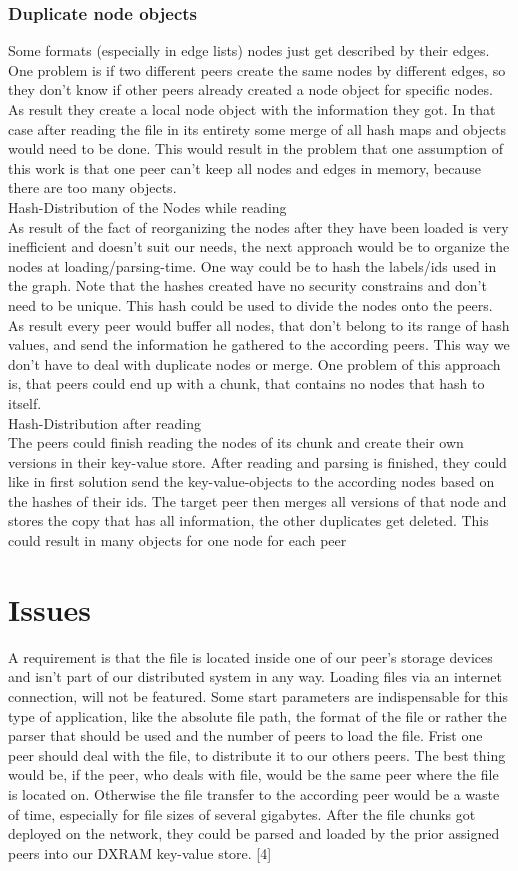 \subsubsection{Duplicate node objects}
Some formats (especially in edge lists) nodes just get described by their edges. One problem is if two different peers create the same nodes by different edges, so they don’t know if other peers already created a node object for specific nodes. As result they create a local node object with the information they got. In that case after reading the file in its entirety some merge of all hash maps and objects would need to be done. This would result in the problem that one assumption of this work is that one peer can’t keep all nodes and edges in memory, because there are too many objects.\\
Hash-Distribution of the Nodes while reading\\
As result of the fact of reorganizing the nodes after they have been loaded is very inefficient and doesn’t suit our needs, the next approach would be to organize the nodes at loading/parsing-time.
One way could be to hash the labels/ids used in the graph. Note that the hashes created have no security constrains and don’t need to be unique. This hash could be used to divide the nodes onto the peers. As result every peer would buffer all nodes, that don’t belong to its range of hash values, and send the information he gathered to the according peers. This way we don’t have to deal with duplicate nodes or merge. One problem of this approach is, that peers could end up with a chunk, that contains no nodes that hash to itself.\\
Hash-Distribution after reading\\
The peers could finish reading the nodes of its chunk and create their own versions in their key-value store. After reading and parsing is finished, they could like in first solution send the key-value-objects to the according nodes based on the hashes of their ids. The target peer then merges all versions of that node and stores the copy that has all information, the other duplicates get deleted. This could result in many objects for one node for each peer

\section{Issues}
A requirement is that the file is located inside one of our peer’s storage devices and isn’t part of our distributed system in any way. Loading files via an internet connection, will not be featured. Some start parameters are indispensable for this type of application, like the absolute file path, the format of the file or rather the parser that should be used and the number of peers to load the file.
Frist one peer should deal with the file, to distribute it to our others peers. The best thing would be, if the peer, who deals with file, would be the same peer where the file is located on. Otherwise the file transfer to the according peer would be a waste of time, especially for file sizes of several gigabytes. After the file chunks got deployed on the network, they could be parsed and loaded by the prior assigned peers into our DXRAM key-value store. [4]


